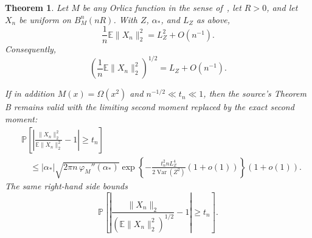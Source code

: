 \documentclass[11pt]{article}
\newtheorem{theorem}{Theorem}
\newcommand{\E}{\mathbb E}
\newcommand{\Pp}{\mathbb P}
\newcommand{\Var}{\operatorname{Var}}
\begin{document}
\begin{theorem}\label{thm:main}
Let $M$ be any Orlicz function in the sense of~\cite{AP}, let $R>0$, and
let $X_n$ be uniform on $B_M^n(nR)$.  With $Z$, $\alpha_*$, and $L_Z$ as
above,
\begin{equation}\label{eq:rate}
 \frac1n\E\|X_n\|_2^2=L_Z^2+O(n^{-1}).
\end{equation}
Consequently,
\[
 \left(\frac1n\E\|X_n\|_2^2\right)^{1/2}
 =L_Z+O(n^{-1}).
\]

If in addition $M(x)=\Omega(x^2)$ and
$n^{-1/2}\ll t_n\ll1$, then the source's Theorem B remains valid with the
limiting second moment replaced by the exact second moment:
\begin{align}\label{eq:centered-bound}
 &\Pp\!\left[
 \left|\frac{\|X_n\|_2^2}{\E\|X_n\|_2^2}-1\right|\ge t_n\right] \\
 &\quad\le
 |\alpha_*|\sqrt{2\pi n\,\varphi_M''(\alpha_*)}
 \exp\!\left\{-\frac{t_n^2nL_Z^4}{2\Var(Z^2)}(1+o(1))\right\}(1+o(1)).
\end{align}
The same right-hand side bounds
\[
 \Pp\!\left[
 \left|\frac{\|X_n\|_2}{(\E\|X_n\|_2^2)^{1/2}}-1\right|\ge t_n\right].
\]
\end{theorem}
\end{document}
